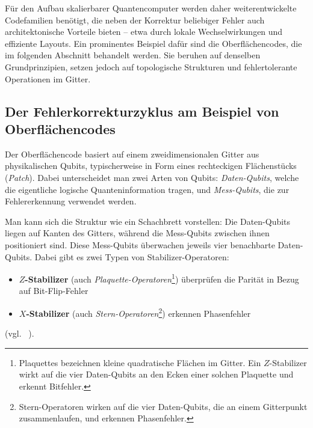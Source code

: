 Für den Aufbau skalierbarer Quantencomputer werden daher weiterentwickelte Codefamilien benötigt, die neben der Korrektur beliebiger Fehler auch architektonische Vorteile bieten – etwa durch lokale Wechselwirkungen und effiziente Layouts. Ein prominentes Beispiel dafür sind die Oberflächencodes, die im folgenden Abschnitt behandelt werden. Sie beruhen auf denselben Grundprinzipien, setzen jedoch auf topologische Strukturen und fehlertolerante Operationen im Gitter.

\subsection{Der Fehlerkorrekturzyklus am Beispiel von Oberflächencodes}\label{chap:QEC3.2}

Der Oberflächencode basiert auf einem zweidimensionalen Gitter aus physikalischen Qubits, typischerweise in Form eines rechteckigen Flächenstücks (\emph{Patch}). Dabei unterscheidet man zwei Arten von Qubits: \emph{Daten-Qubits}, welche die eigentliche logische Quanteninformation tragen, und \emph{Mess-Qubits}, die zur Fehlererkennung verwendet werden.

Man kann sich die Struktur wie ein Schachbrett vorstellen: Die Daten-Qubits liegen auf Kanten des Gitters, während die Mess-Qubits zwischen ihnen positioniert sind. Diese Mess-Qubits überwachen jeweils vier benachbarte Daten-Qubits. Dabei gibt es zwei Typen von Stabilizer-Operatoren:
\begin{itemize}
  \item \textbf{\(Z\)-Stabilizer} (auch \emph{Plaquette-Operatoren}\footnote{Plaquettes bezeichnen kleine quadratische Flächen im Gitter. Ein \(Z\)-Stabilizer wirkt auf die vier Daten-Qubits an den Ecken einer solchen Plaquette und erkennt Bitfehler.}) überprüfen die Parität in Bezug auf Bit-Flip-Fehler
  \item \textbf{\(X\)-Stabilizer} (auch \emph{Stern-Operatoren}\footnote{Stern-Operatoren wirken auf die vier Daten-Qubits, die an einem Gitterpunkt zusammenlaufen, und erkennen Phasenfehler.}) erkennen Phasenfehler
\end{itemize} (vgl.~\cite[677]{google_quantum_ai_suppressing_2023} \cite[28]{devitt_quantum_2013}).


